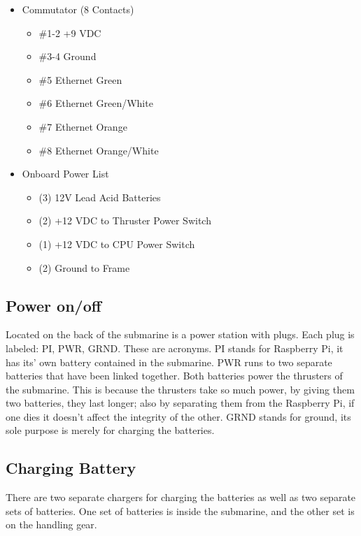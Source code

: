 \documentclass[
10pt, %
a4paper, %
oneside, %
headinclude,footinclude, %
BCOR5mm, %
]{scrartcl}
\begin{document}
\begin{itemize}[noitemsep]
\begin{itemize}[noitemsep]
	\end{itemize}
	\item Commutator (8 Contacts)
		\begin{itemize}[noitemsep]
		\item \#1-2 +9 VDC
		\item \#3-4 Ground
		\item \#5 Ethernet Green
		\item \#6 Ethernet Green/White
		\item \#7 Ethernet Orange
		\item \#8 Ethernet Orange/White
	\end{itemize}
	\item Onboard Power List
		\begin{itemize}[noitemsep]
		\item (3) 12V Lead Acid Batteries
		\item (2) +12 VDC to Thruster Power Switch
		\item (1) +12 VDC to CPU Power Switch
		\item (2) Ground to Frame
	\end{itemize}
	
\end{itemize}


\subsection{Power on/off}

Located on the back of the submarine is a power station with plugs. Each plug is labeled: PI, PWR, GRND. These are acronyms. PI stands for Raspberry Pi, it has its' own battery contained in the submarine. PWR runs to two separate batteries that have been linked together. Both batteries power the thrusters of the submarine. This is because the thrusters take so much power, by giving them two batteries, they last longer; also by separating them from the Raspberry Pi, if one dies it doesn't affect the integrity of the other. GRND stands for ground, its sole purpose is merely for charging the batteries.


\subsection{Charging Battery}

There are two separate chargers for charging the batteries as well as two separate sets of batteries. One set of batteries is inside the submarine, and the other set is on the handling gear.
\end{document}
